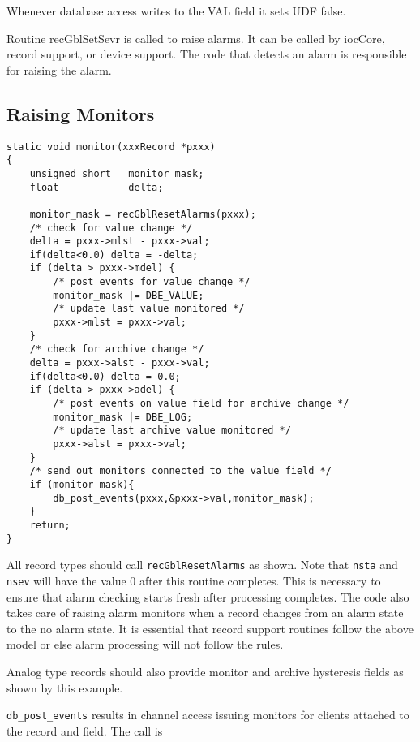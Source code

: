 Whenever database access writes to the VAL field it sets UDF false.

Routine recGblSetSevr is called to raise alarms.
It can be called by iocCore, record support, or device support.
The code that detects an alarm is responsible for raising the alarm.

\subsection{Raising Monitors}

\begin{verbatim}
static void monitor(xxxRecord *pxxx)
{
    unsigned short   monitor_mask;
    float            delta;

    monitor_mask = recGblResetAlarms(pxxx);
    /* check for value change */
    delta = pxxx->mlst - pxxx->val;
    if(delta<0.0) delta = -delta;
    if (delta > pxxx->mdel) {
        /* post events for value change */
        monitor_mask |= DBE_VALUE;
        /* update last value monitored */
        pxxx->mlst = pxxx->val;
    }
    /* check for archive change */
    delta = pxxx->alst - pxxx->val;
    if(delta<0.0) delta = 0.0;
    if (delta > pxxx->adel) {
        /* post events on value field for archive change */
        monitor_mask |= DBE_LOG;
        /* update last archive value monitored */
        pxxx->alst = pxxx->val;
    }
    /* send out monitors connected to the value field */
    if (monitor_mask){
        db_post_events(pxxx,&pxxx->val,monitor_mask);
    }
    return;
}
\end{verbatim}

All record types should call \verb|recGblResetAlarms| as shown.
Note that \verb|nsta| and \verb|nsev| will have the value 0 after this routine completes.
This is necessary to ensure that alarm checking starts fresh after processing completes.
The code also takes care of raising alarm monitors when a record changes from an alarm state to the no alarm state.
It is essential that record support routines follow the above model or else alarm processing will not follow the rules.

Analog type records should also provide monitor and archive hysteresis fields as shown by this example.

\verb|db_post_events| results in channel access issuing monitors for clients attached to the record and field.
The call is

